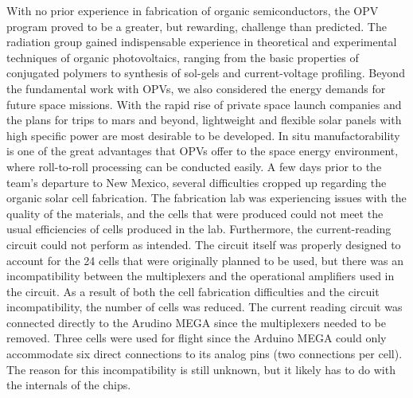 	With no prior experience in fabrication of organic semiconductors, the OPV program proved to be a greater, but rewarding, challenge than predicted. The radiation group gained indispensable experience in theoretical and experimental techniques of organic photovoltaics, ranging from the basic properties of conjugated polymers to synthesis of sol-gels and current-voltage profiling. Beyond the fundamental work with OPVs, we also considered the energy demands for future space missions. With the rapid rise of private space launch companies and the plans for trips to mars and beyond, lightweight and flexible solar panels with high specific power are most desirable to be developed. In situ manufactorability is one of the great advantages that OPVs offer to the space energy environment, where roll-to-roll processing can be conducted easily\cite{rolltoroll}. 
A few days prior to the team's departure to New Mexico, several difficulties cropped up regarding the organic solar cell fabrication.
The fabrication lab was experiencing issues with the quality of the materials, and the cells that were produced could not meet the usual efficiencies of cells produced in the lab.
Furthermore, the current-reading circuit could not perform as intended.
The circuit itself was properly designed to account for the 24 cells that were originally planned to be used, but there was an incompatibility between the multiplexers and the operational amplifiers used in the circuit.
As a result of both the cell fabrication difficulties and the circuit incompatibility, the number of cells was reduced.
The current reading circuit was connected directly to the Arudino MEGA since the multiplexers needed to be removed.
Three cells were used for flight since the Arduino MEGA could only accommodate six direct connections to its analog pins (two connections per cell).
The reason for this incompatibility is still unknown, but it likely has to do with the internals of the chips.

